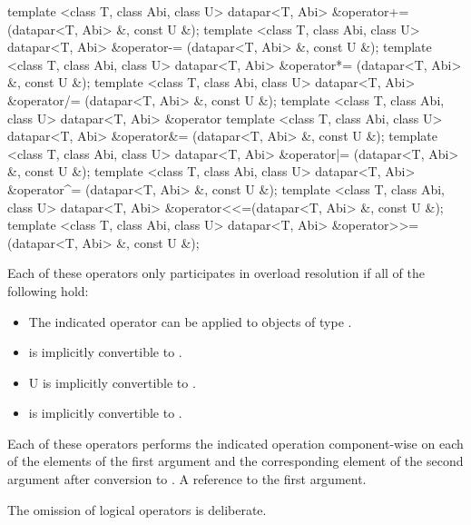 \begin{itemdecl}
template <class T, class Abi, class U> datapar<T, Abi> &operator+= (datapar<T, Abi> &, const U &);
template <class T, class Abi, class U> datapar<T, Abi> &operator-= (datapar<T, Abi> &, const U &);
template <class T, class Abi, class U> datapar<T, Abi> &operator*= (datapar<T, Abi> &, const U &);
template <class T, class Abi, class U> datapar<T, Abi> &operator/= (datapar<T, Abi> &, const U &);
template <class T, class Abi, class U> datapar<T, Abi> &operator%
template <class T, class Abi, class U> datapar<T, Abi> &operator&= (datapar<T, Abi> &, const U &);
template <class T, class Abi, class U> datapar<T, Abi> &operator|= (datapar<T, Abi> &, const U &);
template <class T, class Abi, class U> datapar<T, Abi> &operator^= (datapar<T, Abi> &, const U &);
template <class T, class Abi, class U> datapar<T, Abi> &operator<<=(datapar<T, Abi> &, const U &);
template <class T, class Abi, class U> datapar<T, Abi> &operator>>=(datapar<T, Abi> &, const U &);
\end{itemdecl}
\begin{itemdescr}
  \pnum\remarks Each of these operators only participates in overload resolution if all of the following hold:
  \begin{itemize}
    \item The indicated operator can be applied to objects of type .
    \item \datapar{} is implicitly convertible to .
    \item \type U is implicitly convertible to .
    \item {} is implicitly convertible to \datapar{}.
  \end{itemize}
  \pnum\effects Each of these operators performs the indicated operation component-wise on each of the elements of the first argument and the corresponding element of the second argument after conversion to \datapar{}.
  \pnum\returns A reference to the first argument.
\end{itemdescr}

\realnote The omission of logical operators is deliberate.

